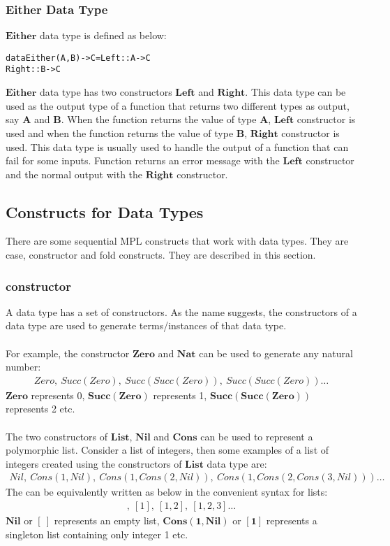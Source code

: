 \documentclass[11pt]{article}
\begin{document}
\subsubsection {Either Data Type}
$\mathbf{Either}$ data type is defined as below:
\begin{alltt}
          data Either(A,B) -> C = Left   :: A -> C 
                                  Right  :: B -> C
\end{alltt}
$\mathbf{Either}$ data type has two constructors $\mathbf{Left}$ and $\mathbf{Right}$. This data type can be used as the output type of a function that returns two different types as output, say $\mathbf{A}$ and $\mathbf{B}$. When the function returns the value of type $\mathbf{A}$, $\mathbf{Left}$ constructor is used and when the function returns the value of type $\mathbf{B}$, $\mathbf{Right}$ constructor is used. This data type is usually used to handle the output of a function that can fail for some inputs. Function returns an error message with the $\mathbf{Left}$ constructor and the normal output with the $\mathbf{Right}$ constructor.

\subsection {Constructs for Data Types}\label{SeqMPL:dataConstruct}
There are some sequential MPL constructs that work with data types. They are {\sf case}, {\sf constructor} and {\sf fold} constructs. They are described in this section.

\subsubsection {constructor}\label{SeqMPL:consConstruct}
A data type has a set of {\sf constructors}. As the name suggests, the {\sf constructors} of a data type are used to generate terms/instances of that data type.
~~\\~~\\
For example, the constructor $\mathbf{Zero}$ and $\mathbf{Nat}$ can be used to generate any natural number:
\begin{align*}
  Zero,~Succ(Zero),~Succ(Succ(Zero)),~Succ(Succ(Zero))\ldots
\end{align*}
$\mathbf{Zero}$ represents 0, $\mathbf{Succ(Zero)}$ represents 1, $\mathbf{Succ(Succ(Zero))}$ represents 2 etc. 
~~\\~~\\
The two constructors of $\mathbf{List}$, $\mathbf{Nil}$ and $\mathbf{Cons}$ can be used to represent a polymorphic list. Consider a list of integers, then some examples of a list of integers created using the constructors of $\mathbf{List}$ data type are:
\begin{align*}
  Nil,~Cons(1,Nil),~Cons(1,Cons(2,Nil)),~Cons(1,Cons(2,Cons(3,Nil)))\ldots
\end{align*}
The can be equivalently written as below in the convenient syntax for lists:
\begin{align*}
  [~],~[1],~[1,2],~[1,2,3]\ldots
\end{align*}
$\mathbf{Nil}$ or $\mathbf{[~]}$ represents an empty list, $\mathbf{Cons(1,Nil)}$ or $\mathbf{[1]}$ represents a singleton list containing only integer 1 etc. 
\end{document}
